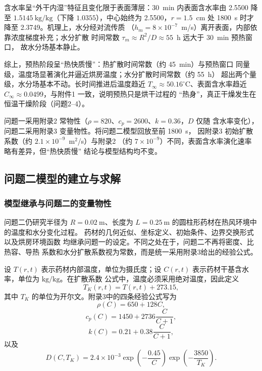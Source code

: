 \documentclass[12pt,a4paper]{article}
\renewcommand{\boxed}[1]{#1}
\begin{document}
\begin{center}
含水率呈``外干内湿''特征且变化限于表面薄层：30~min 内表面含水率由
2.5500 降至 $1.5145\ \mathrm{kg/kg}$（下降 $1.0355$），中心始终为
2.5500，$r=1.5$~cm 处 1800~s 时才降至 2.3749。机理上，水分经对流传质
（$h_m=8\times10^{-7}$~m/s）离开表面，内部依靠浓度梯度补充；水分扩散
时间常数 $\tau_m\approx R^2/D\approx55$~h 远大于 30~min 预热窗口，
故水分场基本静止。

综上，预热阶段呈``热快质慢''：热扩散时间常数（约 45~min）与预热窗口
同量级，温度场显著演化并逼近烘房温度；水分扩散时间常数（约 55~h）
超出两个量级，水分场基本不动。长时间推进后温度趋近
$T_\infty\approx50.16^\circ\mathrm{C}$、表面含水率趋近
$C_\infty\approx0.0499$，与附件1 一致，说明预热只是烘干过程的
``热身''，真正干燥发生在恒温干燥阶段（问题2--4）。

问题一采用附录2 常物性（$\rho=820$、$c_p=2600$、$k=0.36$，$D$ 仅随
含水率变化），问题二采用附录3 变量物性。将问题二模型回放至前 1800~s，
因附录3 初始扩散系数（约 $2.1\times10^{-9}$~m$^2$/s）与附录2
（约 $7\times10^{-9}$）不同，表面含水率演化速率略有差异，但``热快质慢''
结论与模型结构均不变。


\subsection{问题二模型的建立与求解}

\subsubsection{模型继承与问题二的变量物性}

问题二仍研究半径为 $R=0.02\ \mathrm{m}$、长度为
$L=0.25\ \mathrm{m}$ 的圆柱形药材在热风环境中的温度和水分变化过程。
药材的几何近似、坐标定义、初始条件、边界交换形式以及烘房环境函数
均继承问题一的设定。不同之处在于，问题二不再将密度、比热容、导热
系数和水分扩散系数视为常数，而是统一采用附录3给出的经验公式。

设 $T(r,t)$ 表示药材内部温度，单位为摄氏度；设
$C(r,t)$ 表示药材干基含水率，单位为 $\mathrm{kg/kg}$。在扩散系数
公式中，温度必须采用绝对温度，因此定义
\begin{equation}
T_K(r,t)=T(r,t)+273.15,
\end{equation}
其中 $T_K$ 的单位为开尔文。附录3中的四条经验公式写为
\begin{equation}
\boxed{
\rho(C)=650+128C
},
\end{equation}
\begin{equation}
\boxed{
c_p(C)=1450+2736\frac{C}{C+1}
},
\end{equation}
\begin{equation}
\boxed{
k(C)=0.21+0.38\frac{C}{C+1}
},
\end{equation}
以及
\begin{equation}
\boxed{
D(C,T_K)
=
2.4\times10^{-3}
\exp\left(-\frac{0.45}{C}\right)
\exp\left(-\frac{3850}{T_K}\right)
}.
\end{equation}


\end{center}
\end{document}
